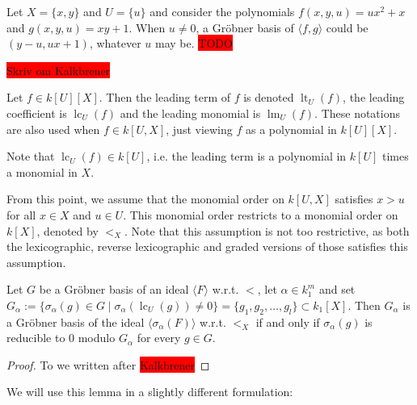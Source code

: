 \documentclass[a4paper, 12pt]{article}
\DeclareMathOperator{\LT}{lt}
\DeclareMathOperator{\LM}{lm}
\DeclareMathOperator{\LC}{lc}
\theoremstyle{changedot}
\theoremstyle{changedotbreak}
\theoremstyle{nonumberplain}
\newtheorem{proof}{Proof}
\begin{document}
\begin{example}
  Let $X = \{x, y\}$ and $U = \{u\}$ and consider the polynomials $f(x, y, u) = ux^{2} + x$ and $g(x, y, u) = xy + 1$. When $u \neq 0$, a Gröbner basis of $\langle f, g \rangle$ could be $(y-u, ux + 1)$, whatever $u$ may be. \colorbox{red}{TODO}
\end{example}

\colorbox{red}{Skriv om Kalkbrener}
\begin{definition}
  Let $f \in k[U][X]$. Then the leading term of $f$ is denoted $\LT_{U}(f)$, the leading coefficient is $\LC_{U}(f)$ and the leading monomial is $\LM_{U}(f)$. These notations are also used when $f \in k[U, X]$, just viewing $f$ as a polynomial in $k[U][X]$.
\end{definition}

Note that $\LC_{U}(f) \in k[U]$, i.e. the leading term is a polynomial in $k[U]$ times a monomial in $X$.

From this point, we assume that the monomial order on $k[U, X]$ satisfies $x > u$ for all $x \in X$ and $u \in U$. This monomial order restricts to a monomial order on $k[X]$, denoted by $<_{X}$. Note that this assumption is not too restrictive, as both the lexicographic, reverse lexicographic and graded versions of those satisfies this assumption.

\begin{lemma}\label{lem:grb_iff_reduc_to_z}
  Let $G$ be a Gröbner basis of an ideal $\langle F \rangle$ w.r.t. $<$, let $\alpha \in k_{1}^{m}$ and set $G_{\alpha} := \{\sigma_{\alpha}(g) \in G \mid \sigma_{\alpha}(\LC_{U}(g)) \neq 0\} = \{g_{1}, g_{2}, \dots, g_{l}\} \subset k_{1}[X]$. Then $G_{\alpha}$ is a Gröbner basis of the ideal $\langle \sigma_{\alpha}(F) \rangle$ w.r.t. $<_{X}$ if and only if $\sigma_{\alpha}(g)$ is reducible to 0 modulo $G_{\alpha}$ for every $g \in G$.
\end{lemma}
\begin{proof}
  To we written after \colorbox{red}{Kalkbrener}
\end{proof}


We will use this lemma in a slightly different formulation:

\end{document}
